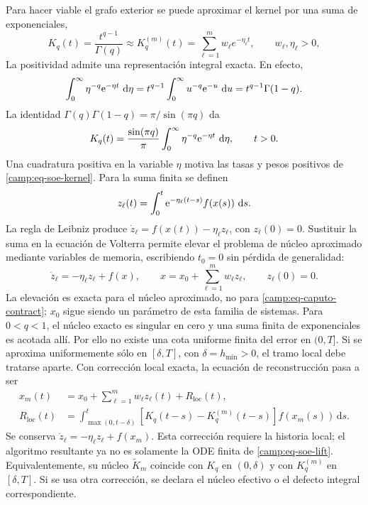 Para hacer viable el grafo exterior se puede aproximar el kernel por una suma
de exponenciales,
\begin{equation}
 K_q(t)=\frac{t^{q-1}}{\Gamma(q)}
 \approx K_q^{(m)}(t)=\sum_{\ell=1}^{m}w_\ell e^{-\eta_\ell t},
 \qquad w_\ell,\eta_\ell>0,
 \label{camp:eq-soe-kernel}
\end{equation}
La positividad admite una representación integral exacta. En efecto,
\[
 \int_0^\infty\eta^{-q}\mathrm e^{-\eta t}\,\,\mathrm d\eta
 =t^{q-1}\int_0^\infty u^{-q}\mathrm e^{-u}\,\,\mathrm d u
 =t^{q-1}\Gamma(1-q).
\]
La identidad \(\Gamma(q)\Gamma(1-q)=\pi/\sin(\pi q)\) da
\[
 K_q(t)=\frac{\sin(\pi q)}{\pi}
        \int_0^\infty\eta^{-q}\mathrm e^{-\eta t}\,\,\mathrm d\eta,
 \qquad t>0.
\]
Una cuadratura positiva en la variable \(\eta\) motiva las tasas y pesos
positivos de \cref{camp:eq-soe-kernel}. Para la suma finita se definen
\[
 z_\ell(t)=\int_0^t\mathrm e^{-\eta_\ell(t-s)}f(x(s))\,\,\mathrm d s.
\]
La regla de Leibniz produce
\(\dot z_\ell=f(x(t))-\eta_\ell z_\ell\), con \(z_\ell(0)=0\). Sustituir
la suma en la ecuación de Volterra permite elevar el problema de núcleo
aproximado mediante variables de memoria,
escribiendo \(t_0=0\) sin pérdida de generalidad:
\begin{equation}
 \dot z_\ell=-\eta_\ell z_\ell+f(x),
 \qquad
 x=x_0+\sum_{\ell=1}^{m}w_\ell z_\ell,
 \qquad z_\ell(0)=0.
 \label{camp:eq-soe-lift}
\end{equation}
La elevación es exacta para el núcleo aproximado, no para
\cref{camp:eq-caputo-contract}; \(x_0\) sigue siendo un parámetro de esta
familia de sistemas. Para \(0<q<1\), el núcleo exacto es singular en cero y
una suma finita de exponenciales es acotada allí. Por ello no existe una cota
uniforme finita del error en \((0,T]\). Si se aproxima uniformemente sólo en
\([\delta,T]\), con \(\delta=h_{\min}>0\), el tramo local debe tratarse aparte.
Con corrección local exacta, la ecuación de reconstrucción pasa a ser
\begin{align}
 x_m(t)&=x_0+\sum_{\ell=1}^{m}w_\ell z_\ell(t)+R_{\mathrm{loc}}(t),\\
 R_{\mathrm{loc}}(t)
 &=\int_{\max(0,t-\delta)}^t
   [K_q(t-s)-K_q^{(m)}(t-s)]f(x_m(s))\,\mathrm ds.
 \label{camp:eq-soe-local-correction}
\end{align}
Se conserva \(\dot z_\ell=-\eta_\ell z_\ell+f(x_m)\). Esta corrección
requiere la historia local; el algoritmo resultante ya no es solamente la ODE
finita de \cref{camp:eq-soe-lift}. Equivalentemente, su núcleo
\(\widetilde K_m\) coincide con \(K_q\) en \((0,\delta)\) y con
\(K_q^{(m)}\) en \([\delta,T]\). Si se usa otra corrección, se declara el
núcleo efectivo o el defecto integral correspondiente.


